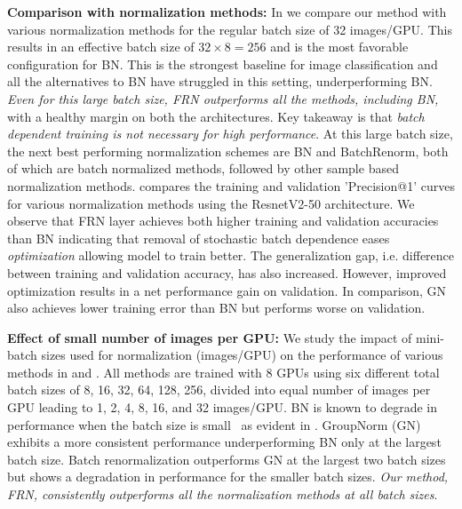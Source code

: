 \documentclass[10pt,twocolumn,letterpaper]{article}
\newcommand{\papername}{FRN}
\newcommand{\batchnorm}{BN}
\newcommand{\groupnorm}{GN}
\begin{document}
\medskip
\noindent
\textbf{Comparison with normalization methods:} In  we compare our method with various normalization methods for the regular batch size of 32 images/GPU. This results in an effective batch size of $32 \times 8 = 256$ and is the most favorable configuration for \batchnorm{}. This is the strongest baseline for image classification and all the alternatives to \batchnorm{} have struggled in this setting, underperforming \batchnorm{}. \emph{Even for this large batch size, \papername{} outperforms all the methods, including \batchnorm{},} with a healthy margin on both the architectures. Key takeaway is that \emph{batch dependent training is not necessary for high performance}. At this large batch size, the next best performing normalization schemes are \batchnorm{} and BatchRenorm, both of which are batch normalized methods, followed by other sample based normalization methods.  compares the training and validation 'Precision@1' curves for various normalization methods using the ResnetV2-50 architecture. We observe that \papername{} layer achieves both higher training and validation accuracies than BN indicating that removal of stochastic batch dependence eases \emph{optimization} allowing model to train better. The generalization gap, i.e. difference between training and validation accuracy, has also increased. However, improved optimization results in a net performance gain on validation. In comparison, GN also achieves lower training error than BN but performs worse on validation.

\medskip
\noindent
\textbf{Effect of small number of images per GPU:}
We study the impact of mini-batch sizes used for normalization (images/GPU) on the performance of various methods in  and . All methods are trained with 8 GPUs using six different total batch sizes of 8, 16, 32, 64, 128, 256, divided into equal number of images per GPU leading to 1, 2, 4, 8, 16, and 32 images/GPU. \batchnorm{} is known to degrade in performance when the batch size is small~\cite{batchrenorm, evalnorm} as evident in . GroupNorm (\groupnorm{}) exhibits a more consistent performance underperforming \batchnorm{} only at the largest batch size. Batch renormalization outperforms \groupnorm{} at the largest two batch sizes but shows a degradation in performance for the smaller batch sizes. \emph{Our method, \papername{}, consistently outperforms all the normalization methods at all batch sizes}. 
\end{document}
